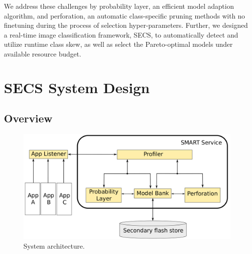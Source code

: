 \documentclass[pageno]{jpaper}
\begin{document}
We address these challenges by probability layer, an efficient model adaption algorithm, and perforation, an automatic class-specific pruning methods with no finetuning during the process of selection hyper-parameters. Further, we designed a real-time image classification framework, SECS, to automatically detect and utilize runtime class skew, as well as select the Pareto-optimal models under available resource budget.
























\section{SECS System Design} \label{SECS}
\subsection{Overview}

\begin{figure} 
\includegraphics[scale=0.095]{architecture.png}
\caption{System architecture.}
\label{fig:Architecture}
\end{figure}
\end{document}

